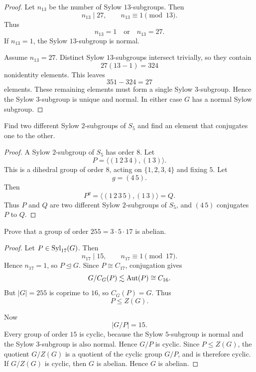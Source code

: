 \begin{proof}
Let \(n_{13}\) be the number of Sylow \(13\)-subgroups. Then
\[
    n_{13}\mid 27,
    \qquad
    n_{13}\equiv 1\pmod {13}.
\]
Thus
\[
    n_{13}=1
    \quad\text{or}\quad
    n_{13}=27.
\]
If \(n_{13}=1\), the Sylow \(13\)-subgroup is normal.

Assume \(n_{13}=27\). Distinct Sylow \(13\)-subgroups intersect trivially, so
they contain
\[
    27(13-1)=324
\]
nonidentity elements. This leaves
\[
    351-324=27
\]
elements. These remaining elements must form a single Sylow \(3\)-subgroup.
Hence the Sylow \(3\)-subgroup is unique and normal. In either case \(G\) has a
normal Sylow subgroup.
\end{proof}

\begin{exercise}
Find two different Sylow \(2\)-subgroups of \(S_5\) and find an element that
conjugates one to the other.
\end{exercise}

\begin{proof}
A Sylow \(2\)-subgroup of \(S_5\) has order \(8\). Let
\[
    P=\langle (1\,2\,3\,4), (1\,3)\rangle.
\]
This is a dihedral group of order \(8\), acting on \(\{1,2,3,4\}\) and fixing
\(5\). Let
\[
    g=(4\,5).
\]
Then
\[
    P^g
    =
    \langle (1\,2\,3\,5),(1\,3)\rangle
    =
    Q.
\]
Thus \(P\) and \(Q\) are two different Sylow \(2\)-subgroups of \(S_5\), and
\((4\,5)\) conjugates \(P\) to \(Q\).
\end{proof}

\begin{exercise}
Prove that a group of order \(255 = 3 \cdot 5 \cdot 17\) is abelian.
\end{exercise}

\begin{proof}
Let \(P\in \operatorname{Syl}_{17}(G)\). Then
\[
    n_{17}\mid 15,
    \qquad
    n_{17}\equiv 1\pmod {17}.
\]
Hence \(n_{17}=1\), so \(P\trianglelefteq G\). Since \(P\cong C_{17}\),
conjugation gives
\[
    G/C_G(P)\lesssim \operatorname{Aut}(P)\cong C_{16}.
\]
But \(|G|=255\) is coprime to \(16\), so \(C_G(P)=G\). Thus
\[
    P\leq Z(G).
\]

Now
\[
    |G/P|=15.
\]
Every group of order \(15\) is cyclic, because the Sylow \(5\)-subgroup is
normal and the Sylow \(3\)-subgroup is also normal. Hence \(G/P\) is cyclic.
Since \(P\leq Z(G)\), the quotient \(G/Z(G)\) is a quotient of the cyclic group
\(G/P\), and is therefore cyclic. If \(G/Z(G)\) is cyclic, then \(G\) is
abelian. Hence \(G\) is abelian.
\end{proof}

